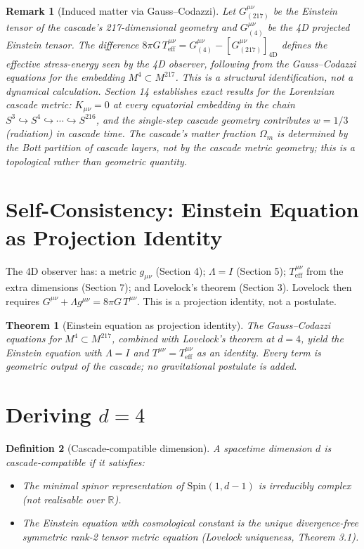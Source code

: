 \documentclass[12pt,a4paper]{article}
\newtheorem{theorem}{Theorem}[section]
\newtheorem{definition}[theorem]{Definition}
\newtheorem*{remark}{Remark}
\begin{document}
\begin{remark}[Induced matter via Gauss--Codazzi]
Let $G^{\mu\nu}_{(217)}$ be the Einstein tensor of
the cascade's 217-dimensional geometry and $G^{\mu\nu}_{(4)}$ be the 4D projected Einstein tensor. The
difference $8\pi G\,T^{\mu\nu}_{\text{eff}} = G^{\mu\nu}_{(4)} - [G^{\mu\nu}_{(217)}]_{\text{4D}}$ defines the effective stress-energy seen by the 4D
observer, following from the Gauss--Codazzi equations for the embedding $M^4 \subset M^{217}$. This
is a structural identification, not a dynamical calculation. Section 14 establishes exact
results for the Lorentzian cascade metric: $K_{\mu\nu} = 0$ at every equatorial embedding in the
chain $S^3 \hookrightarrow S^4 \hookrightarrow \cdots \hookrightarrow S^{216}$, and the single-step cascade geometry contributes $w = 1/3$
(radiation) in cascade time. The cascade's matter fraction $\Omega_m$ is determined by the Bott
partition of cascade layers, not by the cascade metric geometry; this is a topological rather
than geometric quantity.
\end{remark}

\section{Self-Consistency: Einstein Equation as Projection Identity}\label{sec:self-consistency-einstein-equation-as-pr}

The 4D observer has: a metric $g_{\mu\nu}$ (Section 4); $\Lambda = I$ (Section 5); $T^{\mu\nu}_{\text{eff}}$ from the extra
dimensions (Section 7); and Lovelock's theorem (Section 3). Lovelock then requires
$G^{\mu\nu} + \Lambda g^{\mu\nu} = 8\pi G\,T^{\mu\nu}$. This is a projection identity, not a postulate.

\begin{theorem}[Einstein equation as projection identity]
The Gauss--Codazzi equations
for $M^4 \subset M^{217}$, combined with Lovelock's theorem at $d = 4$, yield the Einstein equation
with $\Lambda = I$ and $T^{\mu\nu} = T^{\mu\nu}_{\text{eff}}$ as an identity. Every term is geometric output of the cascade;
no gravitational postulate is added.
\end{theorem}

\section{Deriving \texorpdfstring{$d = 4$}{d = 4}}\label{sec:d-equals-4}

\begin{definition}[Cascade-compatible dimension]
A spacetime dimension $d$ is cascade-compatible if it satisfies:
\begin{itemize}
\item[(C1)] The minimal spinor representation of $\text{Spin}(1, d - 1)$ is irreducibly complex (not
realisable over $\mathbb{R}$).
\item[(C2)] The Einstein equation with cosmological constant is the unique divergence-free symmetric rank-2 tensor metric equation (Lovelock uniqueness, Theorem 3.1).
\end{itemize}
\end{definition}
\end{document}
